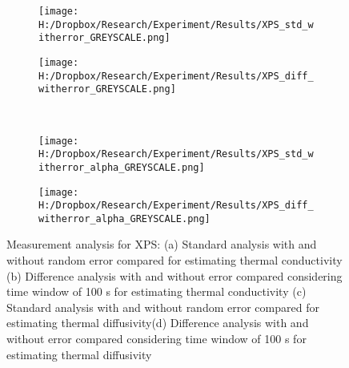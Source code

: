 \documentclass[12pt]{report}
\begin{document}
\begin{figure}
\begin{subfigure}{.5\textwidth}
\centering
\texttt{[image: H:/Dropbox/Research/Experiment/Results/XPS\_std\_witherror\_GREYSCALE.png]}
\caption{}
\end{subfigure}\hfill
\begin{subfigure}{.5\textwidth}
\centering
\texttt{[image: H:/Dropbox/Research/Experiment/Results/XPS\_diff\_witherror\_GREYSCALE.png]}
\caption{}
\end{subfigure}\\
\begin{subfigure}{.5\textwidth}
\centering
\texttt{[image: H:/Dropbox/Research/Experiment/Results/XPS\_std\_witherror\_alpha\_GREYSCALE.png]}
\caption{}
\end{subfigure}\hfill
\begin{subfigure}{.5\textwidth}
\centering
\texttt{[image: H:/Dropbox/Research/Experiment/Results/XPS\_diff\_witherror\_alpha\_GREYSCALE.png]}
\caption{}
\end{subfigure}
\caption{Measurement analysis for XPS: (a) Standard analysis with and without random error compared for estimating thermal conductivity (b) Difference analysis with and without error compared considering time window of 100 s for estimating thermal conductivity (c) Standard analysis with and without random error compared for estimating thermal diffusivity(d) Difference analysis with and without error compared considering time window of 100 s for estimating thermal diffusivity}

\end{figure}

\end{document}
